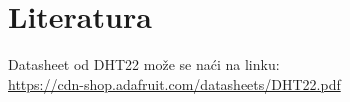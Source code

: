 \documentclass[a4paper, 12pt]{article}
\begin{document}
\begingroup
\sloppy

\section{Literatura}

\vspace{10pt}

%
%
%
%
\begin{enumerate}[label={[\arabic*]}, leftmargin=2.5cm]
	\item Datasheet od DHT22 može se naći na linku: \label{ref:DHT22-datasheet}\\ \url{https://cdn-shop.adafruit.com/datasheets/DHT22.pdf}	
	
\end{enumerate}
\renewcommand{\theenumi}{\arabic{enumi}}

\pagebreak
\endgroup
\end{document}
